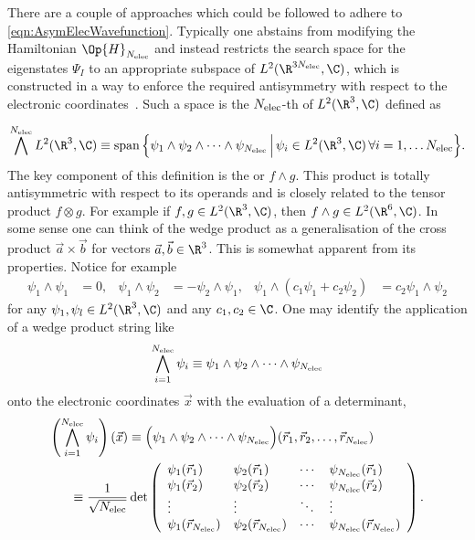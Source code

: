 There are a couple of approaches which could be followed
to adhere to \eqref{eqn:AsymElecWavefunction}.
Typically one abstains from modifying the Hamiltonian $\Op{H}_{\Nelec}$
and instead restricts the search space for the eigenstates $\Psi_I$
to an appropriate subspace of $L^2(\R^{3\Nelec}, \C)$,
which is constructed in a way
to enforce the required
antisymmetry with respect to the electronic coordinates~\cite{Dirac1926,Fock1930}.
Such a space is the $N_\text{elec}$-th  of $L^2(\R^3, \C)$ defined as
\newcommand{\wedgestring}{\psi_1 \wedge \psi_2 \wedge \cdots \wedge \psi_{\Nelec}}

\begin{equation}
	\bigwedge^{\Nelec} L^2(\R^3, \C)
	\equiv \spacespan \Big\{ \wedgestring
	\, \Big| \, \psi_i \in L^2(\R^3, \C) \, \forall i = 1, \ldots \Nelec \Big\}.
	\label{eqn:DefExteriorPower}
\end{equation}
The key component of this definition is the 
or  $f \wedge g$.
This product is totally antisymmetric with respect to its operands
and is closely related to the tensor product $f \otimes g$.
For example if $f, g \in L^2(\R^3, \C)$, then $f \wedge g \in L^2(\R^6, \C)$.
In some sense one can think of the wedge product
as a generalisation of the  cross product $\vec{a} \times \vec{b}$
for vectors $\vec{a}, \vec{b} \in \R^3$.
This is somewhat apparent from its properties.
Notice for example
\begin{align}
	\label{eqn:PropertiesExteriorProduct}
	\psi_1 \wedge \psi_1 &= 0, &\psi_1 \wedge \psi_2 &= -\psi_2 \wedge \psi_1, &
	\psi_1 \wedge (c_1 \psi_1 + c_2 \psi_2) &= c_2 \psi_1 \wedge \psi_2
\end{align}
for any $\psi_1, \psi_l \in L^2(\R^3, \C)$ and any $c_1, c_2 \in \C$.
One may identify the application of a wedge product string like
\[ \bigwedge_{i=1}^{\Nelec} \psi_i \equiv \wedgestring \]
onto the electronic coordinates $\vec{x}$
with the evaluation of a determinant, \ie
\begin{align*}
	\left( \bigwedge_{i=1}^{\Nelec} \psi_i \right) (\vec{x})
	&\equiv \Big(\wedgestring\Big) (\vec{r}_1, \vec{r}_2, \ldots, \vec{r}_{\Nelec}) \\
	\equiv \frac{1}{\sqrt{\Nelec}} &\det
	\left(
	\begin{array}{*{6}{l}}
		\psi_1(\vec{r}_1) & \psi_2(\vec{r}_1) & \cdots & \psi_{\Nelec}(\vec{r}_1) \\
		\psi_1(\vec{r}_2) & \psi_2(\vec{r}_2) & \cdots & \psi_{\Nelec}(\vec{r}_2) \\
		\vdots & \vdots & \ddots & \vdots \\
		\psi_1(\vec{r}_{\Nelec}) & \psi_2(\vec{r}_{\Nelec}) & \cdots & \psi_{\Nelec}(\vec{r}_{\Nelec}) \\
	\end{array}
	\right).
\end{align*}
